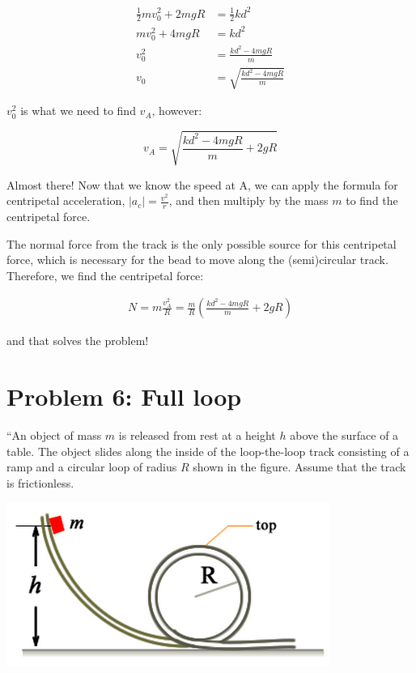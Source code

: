 \documentclass[8.01x]{subfiles}
\begin{document}
\begin{align}
\frac{1}{2} m v_0^2 + 2 m g R &= \frac{1}{2} k d^2\\
m v_0^2 + 4 m g R &= k d^2\\
v_0^2 &= \frac{k d^2 - 4 m g R}{m}\\
v_0   &= \sqrt{\frac{k d^2 - 4 m g R}{m}}
\end{align}

$v_0^2$ is what we need to find $v_A$, however:

\begin{equation}
v_A = \sqrt{\frac{k d^2 - 4 m g R}{m} + 2 g R}
\end{equation}

Almost there! Now that we know the speed at A, we can apply the formula for centripetal acceleration, $\displaystyle |a_c| = \frac{v^2}{r}$, and then multiply by the mass $m$ to find the centripetal force.

The normal force from the track is the only possible source for this centripetal force, which is necessary for the bead to move along the (semi)circular track. Therefore, we find the centripetal force:

\begin{align}
N = m \frac{v_A^2}{R} = \frac{m}{R} \left(\frac{k d^2 - 4 m g R}{m} + 2 g R\right)
\end{align}

and that solves the problem!

\section{Problem 6: Full loop}

``An object of mass $m$ is released from rest at a height $h$ above the surface of a table. The object slides along the inside of the loop-the-loop track consisting of a ramp and a circular loop of radius $R$ shown in the figure. Assume that the track is frictionless.

\begin{center}
\includegraphics[scale=0.6]{Graphics/h4p6}
\end{center}
\end{document}
